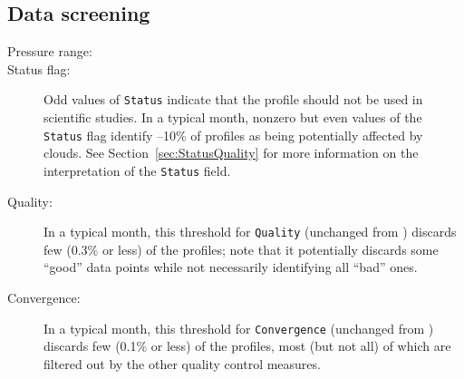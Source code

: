 \begin{nofloatpages}
\subsection{Data screening}
\label{sec:CH3ClScreening}
\begin{description}
  \item[Pressure range:] 

    \standardrangestatement

    \standardprecisionrule

  \item[Status flag:]  
  
  Odd values of \texttt{Status} indicate that the profile should not be used in scientific studies. In a typical month, nonzero but even values of the \texttt{Status} flag identify --10\% of  profiles as being potentially affected by clouds.  See Section~\ref{sec:StatusQuality} for more information on the interpretation of the \texttt{Status} field.

  \item[Quality:]  In a typical month, this threshold for \texttt{Quality} (unchanged from \prevv) discards few (0.3\% or less) of the  profiles; note that it potentially discards some ``good'' data points while not necessarily identifying all ``bad'' ones.

  \item[Convergence:]  In a typical month, this threshold for \texttt{Convergence} (unchanged from \prevv) discards few (0.1\% or less) of the  profiles, most (but not all) of which are filtered out by the other quality control measures.


\end{description}
\end{nofloatpages}
